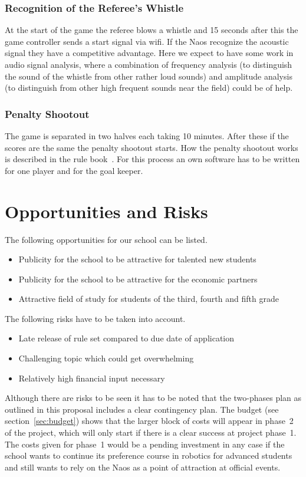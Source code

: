 \documentclass[12pt]{article}
\theoremstyle{definition}
\begin{document}
\subsubsection{Recognition of the Referee's Whistle}
At the start of the game the referee blows a whistle and 15 seconds after this the game controller sends a start signal via wifi. If the Naos recognize the acoustic signal they have a competitive advantage. Here we expect to have some work in audio signal analysis, where a combination of frequency analysis (to distinguish the sound of the whistle from other rather loud sounds) and amplitude analysis (to distinguish from other high frequent sounds near the field) could be of help.

\subsubsection{Penalty Shootout}
The game is separated in two halves each taking 10 minutes. After these if the scores are the same the penalty shootout starts. How the penalty shootout works is described in the rule book~\cite{robocup_technical_committee_robocup_2016}. For this process an own software has to be written for one player and for the goal keeper. 


\section{Opportunities and Risks}
The following opportunities for our school can be listed.
\begin{itemize}
\item Publicity for the school to be attractive for talented new students
\item Publicity for the school to be attractive for the economic partners
\item Attractive field of study for students of the third, fourth and fifth grade
\end{itemize}
The following risks have to be taken into account.
\begin{itemize}
\item Late release of rule set compared to due date of application
\item Challenging topic which could get overwhelming
\item Relatively high financial input necessary
\end{itemize}
Although there are risks to be seen it has to be noted that the two-phases plan as outlined in this proposal includes a clear contingency plan. The budget (see section~\ref{sec:budget}) shows that the larger block of costs will appear in phase~2 of the project, which will only start if there is a clear success at project phase~1. The costs given for phase~1 would be a pending investment in any case if the school wants to continue its preference course in robotics for advanced students and still wants to rely on the Naos as a point of attraction at official events. 
\end{document}
